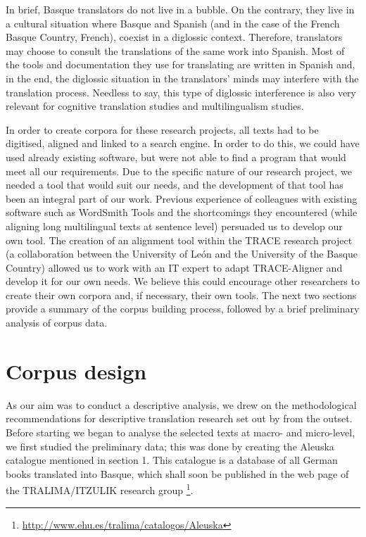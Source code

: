 \documentclass[output=paper]{LSP/langsci}
\begin{document}
In brief, Basque translators do not live in a bubble. On the contrary, they live in a cultural situation where Basque and Spanish (and in the case of the French Basque Country, French), coexist in a diglossic context. Therefore, translators may choose to consult the translations of the same work into Spanish. Most of the tools and documentation they use for translating are written in Spanish and, in the end, the diglossic situation in the translators’ minds may interfere with the translation process. Needless to say, this type of diglossic interference is also very relevant for cognitive translation studies and multilingualism studies.

In order to create corpora for these research projects, all texts had to be digitised, aligned and linked to a search engine. In order to do this, we could have used already existing software, but were not able to find a program that would meet all our requirements. Due to the specific nature of our research project, we needed a tool that would suit our needs, and the development of that tool has been an integral part of our work. Previous experience of colleagues with existing software such as WordSmith Tools and the shortcomings they encountered (while aligning long multilingual texts at sentence level) persuaded us to develop our own tool. The creation of an alignment tool within the TRACE research project (a collaboration between the University of León and the University of the Basque Country) allowed us to work with an IT expert to adapt TRACE-Aligner and develop it for our own needs. We believe this could encourage other researchers to create their own corpora and, if necessary, their own tools. The next two sections provide a summary of the corpus building process, followed by a brief preliminary analysis of corpus data.

\section{Corpus design}

As our aim was to conduct a descriptive analysis, we drew on the methodological recommendations for descriptive translation research set out by \citet{Lambert1985} from the outset. Before starting we began to analyse the selected texts at macro- and micro-level, we first studied the preliminary data; this was done by creating the Aleuska catalogue mentioned in section 1. This catalogue is a database of all German books translated into Basque, which shall soon be published in the web page of the TRALIMA/ITZULIK research group \footnote{\url{http://www.ehu.es/tralima/catalogos/Aleuska}}.
\end{document}
